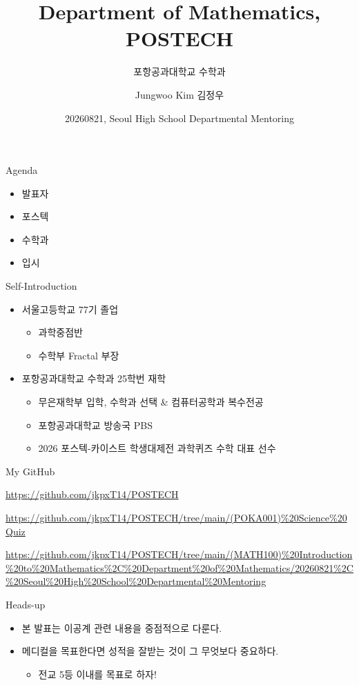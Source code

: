 \documentclass[12pt,aspectratio=169]{beamer}
\title[Department of Mathematics]{Department of Mathematics, POSTECH}
\subtitle{포항공과대학교 수학과}
\author[Jungwoo Kim]{Jungwoo Kim 김정우}
\institute[POSTECH]{@jkpxt14\\jkpxt14@postech.ac.kr}
\date{20260821, Seoul High School Departmental Mentoring}
\newenvironment{mainitemize}{\begin{itemize}\setlength{\itemsep}{0.72em}}{\end{itemize}}
\newenvironment{subitemize}{\begin{itemize}\setlength{\itemsep}{0.22em}}{\end{itemize}}
\begin{document}
\begin{frame}
  \titlepage
\end{frame}

\begin{frame}{Agenda}
\begin{mainitemize}
  \item 발표자
  \item 포스텍
  \item 수학과
  \item 입시
\end{mainitemize}
\end{frame}

\begin{frame}{Self-Introduction}
\begin{mainitemize}
  \item 서울고등학교 77기 졸업
    \begin{subitemize}
      \item 과학중점반
      \item 수학부 Fractal 부장
    \end{subitemize}
  \item 포항공과대학교 수학과 25학번 재학
    \begin{subitemize}
      \item 무은재학부 입학, 수학과 선택 \& 컴퓨터공학과 복수전공
      \item 포항공과대학교 방송국 PBS
      \item 2026 포스텍-카이스트 학생대제전 과학퀴즈 수학 대표 선수
    \end{subitemize}
\end{mainitemize}
\vspace{0.25em}
\begin{block}{My GitHub}
{\scriptsize
\url{https://github.com/jkpxT14/POSTECH}\par\medskip
\url{https://github.com/jkpxT14/POSTECH/tree/main/(POKA001)\%20Science\%20Quiz}\par\medskip
\url{https://github.com/jkpxT14/POSTECH/tree/main/(MATH100)\%20Introduction\%20to\%20Mathematics\%2C\%20Department\%20of\%20Mathematics/20260821\%2C\%20Seoul\%20High\%20School\%20Departmental\%20Mentoring}
}
\end{block}
\end{frame}

\begin{frame}{Heads-up}
\begin{mainitemize}
  \item 본 발표는 이공계 관련 내용을 중점적으로 다룬다.
  \item 메디컬을 목표한다면 성적을 잘받는 것이 그 무엇보다 중요하다.
    \begin{subitemize}
      \item 전교 5등 이내를 목표로 하자!
    \end{subitemize}
\end{mainitemize}
\end{frame}
\end{document}
